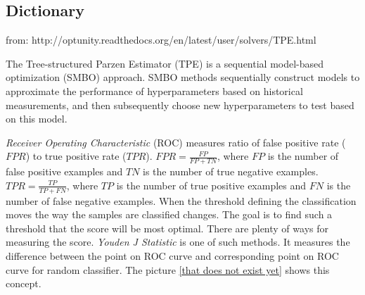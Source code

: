 \documentclass[a4paper,10pt]{report}
\begin{document}
   \begin{appendices}
    \chapter{Dictionary}\label{appendiks}
      from: http://optunity.readthedocs.org/en/latest/user/solvers/TPE.html 
      
      The Tree-structured Parzen Estimator (TPE) is a sequential model-based optimization (SMBO) approach. SMBO methods sequentially construct models to approximate the performance of hyperparameters based on historical measurements, and then subsequently choose new hyperparameters to test based on this model. 
      
      \emph{Receiver Operating Characteristic} (ROC) measures ratio of false positive rate ($FPR$) to true positive rate ($TPR$). $FPR = \frac{FP}{FP + TN}$, where $FP$ is the number of false positive examples and $TN$ is the number of true negative examples. $TPR = \frac{TP}{TP + FN}$, where $TP$ is the number of true positive examples and $FN$ is the number of false negative examples. When the threshold defining the classification moves the way the samples are classified changes. The goal is to find such a threshold that the score will be most optimal. There are plenty of ways for measuring the score. \emph{Youden J Statistic} is one of such methods. It measures the difference between the point on ROC curve and corresponding point on ROC curve for random classifier. The picture \ref{that does not exist yet} shows this concept.
      
  \end{appendices}
      
\end{document}
